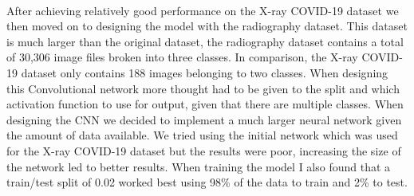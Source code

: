 \\
After achieving relatively good performance on the X-ray COVID-19 dataset we then moved on to designing the model with the radiography dataset. This dataset is much larger than the original dataset, the radiography dataset contains a total of 30,306 image files broken into three classes.  In comparison, the X-ray COVID-19 dataset only contains 188 images belonging to two classes.  When designing this Convolutional network more thought had to be given to the split and which activation function to use for output, given that there are multiple classes.  When designing the CNN we decided to implement a much larger neural network given the amount of data available.  We tried using the initial network which was used for the X-ray COVID-19 dataset but the results were poor, increasing the size of the network led to better results.  When training the model I also found that a train/test split of 0.02 worked best using 98\% of the data to train and 2\% to test.
\begin{table}[H]
    \centering
    \caption{Second CNN baseline model architecture for COVID Radiography Dataset}
    \label{tab:Second CNN baseline model architecture for COVID Radiography Dataset}
\end{table}


